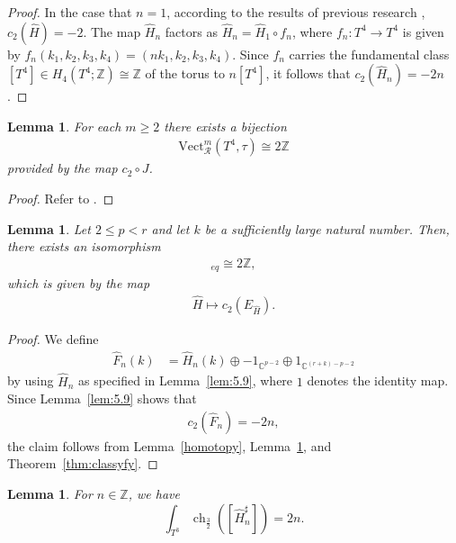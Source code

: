 \documentclass{amsart}
\newtheorem{lem}[thm]{Lemma}
\theoremstyle{definition}
\theoremstyle{remark}
\begin{document}
\begin{proof}
In the case that $n=1$, according to the results of previous research \cite{R}, $c_2(\hat{H})=-2$.
The map $\hat{H}_n$ factors as $\hat{H}_n = \hat{H}_1 \circ f_n$, where $f_n : T^4 \to T^4$ is given by $f_n(k_1, k_2, k_3, k_4) = (n k_1, k_2, k_3, k_4)$. Since $f_n$ carries the fundamental class $[T^4] \in H_4(T^4; \mathbb{Z}) \cong \mathbb{Z}$ of the torus to $n [T^4]$, it follows that $c_2(\hat{H}_n) =-2n$.
\end{proof}

\begin{lem}\label{lem:5.10}
For each $m\geq 2$ there exists a bijection 
\begin{align*}
\text{Vect}_{\mathcal{R}}^m(T^4, \tau) \cong 2\mathbb{Z}
\end{align*}
provided by the map $c_2 \circ J$.
\end{lem}

\begin{proof}
Refer to \cite{DG}.
\end{proof}

\begin{lem}\label{lem:5:11}
Let $2 \le p < r$ and let $k$ be a sufficiently large natural number. Then, there exists an isomorphism
\begin{align*}
[T^4, \mathrm{Herm}_p(\mathbb{C}^{r+k})]_{eq} \cong 2\mathbb{Z},
\end{align*}
which is given by the map
\begin{align*}
\hat{H} \mapsto c_2(E_{\hat{H}}).
\end{align*}
\end{lem}

\begin{proof}
We define
\begin{align*}
\hat{F}_{n}(k) &= \hat{H}_{n}(k) \oplus -1_{\mathbb{C}^{p-2}} \oplus 1_{\mathbb{C}^{(r+k)-p-2}}
\end{align*}
by using $\hat{H}_n$ as specified in Lemma~\ref{lem:5.9}, where $1$ denotes the identity map. Since Lemma~\ref{lem:5.9} shows that
\begin{align*}
c_2(\hat{F}_n) = -2n,
\end{align*}
the claim follows from Lemma~\ref{homotopy}, Lemma~\ref{lem:5.10}, and Theorem~\ref{thm:classyfy}.
\end{proof}

\begin{lem}\label{lem:4.21}
For $n \in \mathbb{Z}$, we have
\[
\int_{T^3}\operatorname{ch}_{\frac{3}{2}}([\hat{H}_n^\sharp])=2n.
\]
\end{lem}
\end{document}
